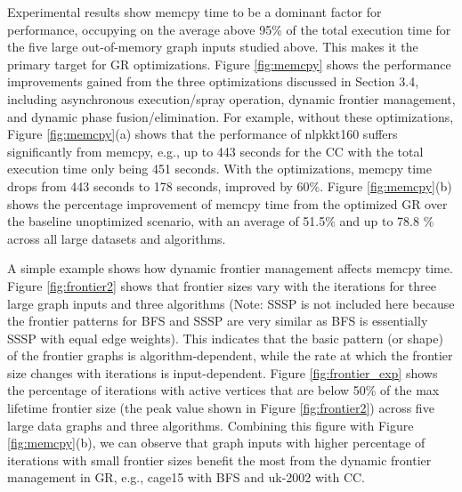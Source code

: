 Experimental results show memcpy time to be a dominant factor for performance, occupying on the average above 95\% of the total execution time 
for the five large out-of-memory graph inputs studied above. This makes it the primary target for GR optimizations.
Figure \ref{fig:memcpy} shows the performance improvements gained from the three optimizations discussed in Section 3.4, 
including asynchronous execution/spray operation, dynamic frontier management, and dynamic phase fusion/elimination. 
For example, without these optimizations, Figure \ref{fig:memcpy}(a) shows that the performance of nlpkkt160 suffers significantly from memcpy, 
e.g., up to 443 seconds for the CC with the total execution time only being 451 seconds. With the optimizations, memcpy time drops from 
443 seconds to 178 seconds, improved by 60\%. Figure \ref{fig:memcpy}(b) shows the percentage improvement of memcpy time from 
the optimized GR over the baseline unoptimized scenario, with an average of 51.5\% and up to 78.8 \% across all large datasets and algorithms. 



A simple example shows how dynamic frontier management affects memcpy time. Figure \ref{fig:frontier2} shows that frontier sizes vary with the iterations 
for three large graph inputs and three algorithms (Note: SSSP is not included here because the frontier patterns for BFS and SSSP are very 
similar as BFS is essentially SSSP with equal edge weights). This indicates that the basic pattern (or shape) of the frontier graphs 
is algorithm-dependent, while the rate at which the frontier size changes with iterations is input-dependent. 
Figure \ref{fig:frontier_exp} shows the percentage of iterations with active vertices that are below 50\% of the max lifetime frontier size 
(the peak value shown in Figure \ref{fig:frontier2}) across five large data graphs and three algorithms. Combining this figure with 
Figure \ref{fig:memcpy}(b), we can observe that graph inputs with higher percentage of iterations with small frontier sizes benefit 
the most from the dynamic frontier management in GR, e.g., cage15 with BFS and uk-2002 with CC.



